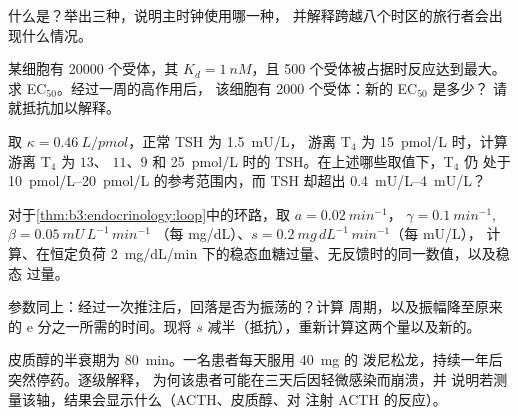 \begin{exercise}[$\star$]\label{exo:b3:endocrinology:4}
什么是？举出三种，说明主时钟使用哪一种，
并解释跨越八个时区的旅行者会出现什么情况。
\end{exercise}

\begin{exercise}[$\star\star$]\label{exo:b3:endocrinology:5}
某细胞有 \num{20000} 个受体，其 $K_{d} = \qty{1}{nM}$，且
\num{500} 个受体被占据时反应达到最大。求 EC$_{50}$。经过一周的高作用后，
该细胞有 \num{2000} 个受体：新的 EC$_{50}$ 是多少？
请就抵抗加以解释。
\end{exercise}

\begin{exercise}[$\star\star$]\label{exo:b3:endocrinology:6}
取 $\kappa = \qty{0.46}{L/pmol}$，正常 TSH 为 \qty{1.5}{mU/L}，
游离 T$_{4}$ 为 \qty{15}{pmol/L} 时，计算游离 T$_{4}$ 为 $13$、
$11$、$9$ 和 \qty{25}{pmol/L} 时的 TSH。在上述哪些取值下，T$_{4}$ 仍
处于 \qtyrange{10}{20}{pmol/L} 的参考范围内，而 TSH
却超出 \qtyrange{0.4}{4}{mU/L}？
\end{exercise}

\begin{exercise}[$\star\star$]\label{exo:b3:endocrinology:7}
对于\cref{thm:b3:endocrinology:loop}中的环路，取 $a = \qty{0.02}{min^{-1}}$，
$\gamma = \qty{0.1}{min^{-1}}$, $\beta = \qty{0.05}{mU\,L^{-1}\,min^{-1}}$
（每 mg/dL）、$s = \qty{0.2}{mg\,dL^{-1}\,min^{-1}}$（每 mU/L），
计算、在恒定负荷
\qty{2}{mg/dL/min} 下的稳态血糖过量、无反馈时的同一数值，以及稳态
过量。
\end{exercise}

\begin{exercise}[$\star\star$]\label{exo:b3:endocrinology:8}
参数同上：经过一次推注后，回落是否为振荡的？计算
周期，以及振幅降至原来的 $\mathrm{e}$ 分之一所需的时间。现将
$s$ 减半（抵抗），重新计算这两个量以及新的。
\end{exercise}

\begin{exercise}[$\star\star$]\label{exo:b3:endocrinology:9}
皮质醇的半衰期为 \qty{80}{min}。一名患者每天服用 \qty{40}{mg} 的
泼尼松龙，持续一年后突然停药。逐级解释，
为何该患者可能在三天后因轻微感染而崩溃，并
说明若测量该轴，结果会显示什么（ACTH、皮质醇、对
注射 ACTH 的反应）。
\end{exercise}

